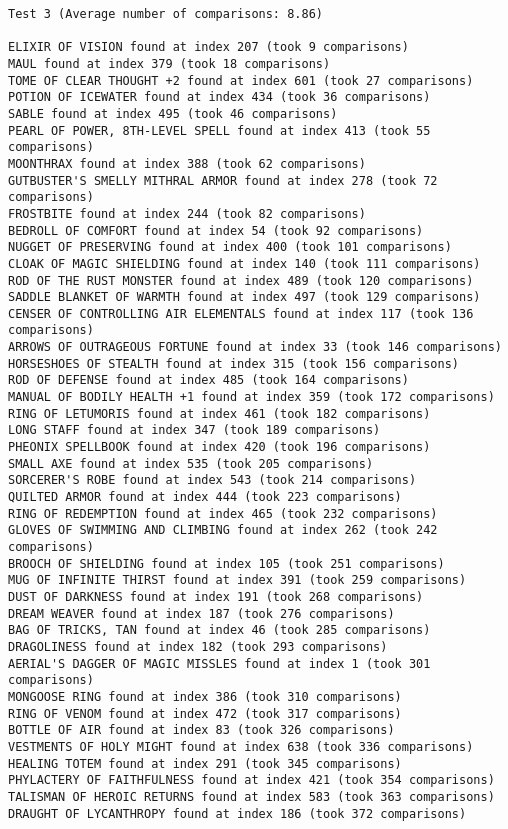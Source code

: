 \documentclass{article}
\begin{document}
\pagebreak

\begin{verbatim}
Test 3 (Average number of comparisons: 8.86)

ELIXIR OF VISION found at index 207 (took 9 comparisons)
MAUL found at index 379 (took 18 comparisons)
TOME OF CLEAR THOUGHT +2 found at index 601 (took 27 comparisons)
POTION OF ICEWATER found at index 434 (took 36 comparisons)
SABLE found at index 495 (took 46 comparisons)
PEARL OF POWER, 8TH-LEVEL SPELL found at index 413 (took 55 comparisons)
MOONTHRAX found at index 388 (took 62 comparisons)
GUTBUSTER'S SMELLY MITHRAL ARMOR found at index 278 (took 72 comparisons)
FROSTBITE found at index 244 (took 82 comparisons)
BEDROLL OF COMFORT found at index 54 (took 92 comparisons)
NUGGET OF PRESERVING found at index 400 (took 101 comparisons)
CLOAK OF MAGIC SHIELDING found at index 140 (took 111 comparisons)
ROD OF THE RUST MONSTER found at index 489 (took 120 comparisons)
SADDLE BLANKET OF WARMTH found at index 497 (took 129 comparisons)
CENSER OF CONTROLLING AIR ELEMENTALS found at index 117 (took 136 comparisons)
ARROWS OF OUTRAGEOUS FORTUNE found at index 33 (took 146 comparisons)
HORSESHOES OF STEALTH found at index 315 (took 156 comparisons)
ROD OF DEFENSE found at index 485 (took 164 comparisons)
MANUAL OF BODILY HEALTH +1 found at index 359 (took 172 comparisons)
RING OF LETUMORIS found at index 461 (took 182 comparisons)
LONG STAFF found at index 347 (took 189 comparisons)
PHEONIX SPELLBOOK found at index 420 (took 196 comparisons)
SMALL AXE found at index 535 (took 205 comparisons)
SORCERER'S ROBE found at index 543 (took 214 comparisons)
QUILTED ARMOR found at index 444 (took 223 comparisons)
RING OF REDEMPTION found at index 465 (took 232 comparisons)
GLOVES OF SWIMMING AND CLIMBING found at index 262 (took 242 comparisons)
BROOCH OF SHIELDING found at index 105 (took 251 comparisons)
MUG OF INFINITE THIRST found at index 391 (took 259 comparisons)
DUST OF DARKNESS found at index 191 (took 268 comparisons)
DREAM WEAVER found at index 187 (took 276 comparisons)
BAG OF TRICKS, TAN found at index 46 (took 285 comparisons)
DRAGOLINESS found at index 182 (took 293 comparisons)
AERIAL'S DAGGER OF MAGIC MISSLES found at index 1 (took 301 comparisons)
MONGOOSE RING found at index 386 (took 310 comparisons)
RING OF VENOM found at index 472 (took 317 comparisons)
BOTTLE OF AIR found at index 83 (took 326 comparisons)
VESTMENTS OF HOLY MIGHT found at index 638 (took 336 comparisons)
HEALING TOTEM found at index 291 (took 345 comparisons)
PHYLACTERY OF FAITHFULNESS found at index 421 (took 354 comparisons)
TALISMAN OF HEROIC RETURNS found at index 583 (took 363 comparisons)
DRAUGHT OF LYCANTHROPY found at index 186 (took 372 comparisons)
\end{verbatim}
\end{document}
